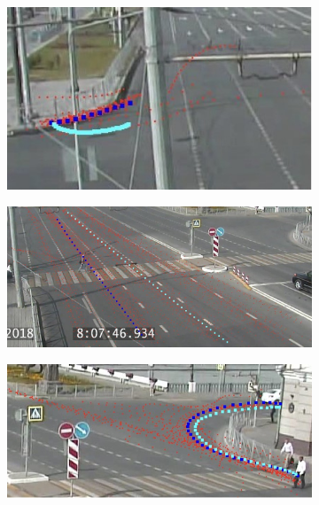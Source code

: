 \begin{figure}[!htb]
	\centering
	\begin{subfigure}[!htb]{0.40\textwidth}
		\centering{}
		\includegraphics[width=\textwidth]{images/classif-res/classif-norm-res-1-1.jpeg}
		\caption{}
	\end{subfigure}
	\hfill
	\begin{subfigure}[!htb]{0.57\textwidth}
		\centering{}
		\includegraphics[width=\textwidth]{images/classif-res/classif-norm-res-1-2.jpeg}
		\caption{}
	\end{subfigure}
	\hfill
	\begin{subfigure}[!htb]{0.485\textwidth}
		\centering{}
		\includegraphics[width=\textwidth]{images/classif-res/classif-norm-res-1-3.jpeg}

\end{subfigure}
\end{figure}

